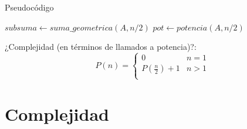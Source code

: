 \documentclass[pdf]{beamer}
\begin{document}
\begin{frame}{Pseudocódigo}
    
\begin{algorithmic}

	\State {} 
    \EndIf

    \vspace{0.5em}
    \State $subsuma \gets suma\_geometrica(A, n/2)$  
    \vspace{0.5em}
    \State $pot \gets potencia(A, n/2)$ 
    \vspace{0.5em}
    
    \State {} 
    \vspace{0.5em}
    
\EndFunction

\pause

¿Complejidad (en términos de llamados a potencia)?: 
\pause
 \[ P(n) =  \begin{cases} 
    0 & n = 1 \\
    P(\frac{n}{2}) + 1 & n > 1 \\ 
   \end{cases}
 \]


\end{algorithmic}

\end{frame}

\section{Complejidad}
\end{document}
